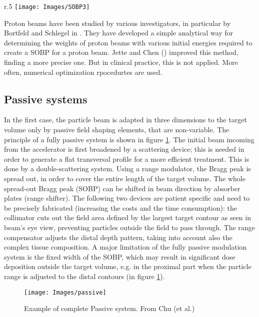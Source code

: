 \documentclass[12pt, a4paper, twoside]{book}
\begin{document}
\begin{wrapfigure}{r}{.5\textwidth}
{\texttt{[image: Images/SOBP3]}}
\caption{Comparison between protons Spread Out Bragg Peak and photons energy loss in matter. From Degiovanni \cite{deg:lin}}
\label{fig:sobp}
\vspace{-10mm}
\end{wrapfigure}
\noindent 
Proton beams have been studied by various investigators, in particular by Bortfeld and Schlegel in \cite{bort:SOBP}. They have developed a simple analytical way for determining the weights of proton beams with various initial energies required to create a SOBP for a proton beam. Jette and Chen (\cite{jett:SOBP}) improved this method, finding a more precise one. 
But in clinical practice, this is not applied. More often, numerical optimization rpocedurtes are used.

\subsection{Passive systems}
In the first case, the particle beam is adapted in three dimensions to the target volume only by passive field shaping elements, that are non-variable.
The principle of a fully passive system is shown in figure \ref{fig:passive}. The initial beam incoming from the accelerator is first broadened by a scattering device; this is needed in order to generate a flat transversal profile for a more efficient treatment. This is done by a double-scattering system.
Using a range modulator, the Bragg peak is spread out, in order to cover the entire length of the target volume. The whole spread-out Bragg peak (SOBP) can be shifted in beam direction by absorber plates (range shifter). 
The following two devices are patient specific and need to be precisely fabricated (increasing the costs and the time consumption): the collimator cuts out the field area defined by the largest target contour as seen in beam’s eye view, preventing particles outside the field to pass through. 
The range compensator adjusts the distal depth pattern, taking into account also the complex tissue composition. A major limitation of the fully passive modulation system is the fixed width of the SOBP, which may result in significant dose deposition outside the target volume, e.g. in the proximal part when the particle range is adjusted to the distal contours (in figure \ref{fig:passive}).
\begin{figure}[t]
{\texttt{[image: Images/passive]}}
\caption{Example of complete Passive system. From Chu (et al.) \cite{chu:pass}}
\label{fig:passive}
\end{figure}
\end{document}
